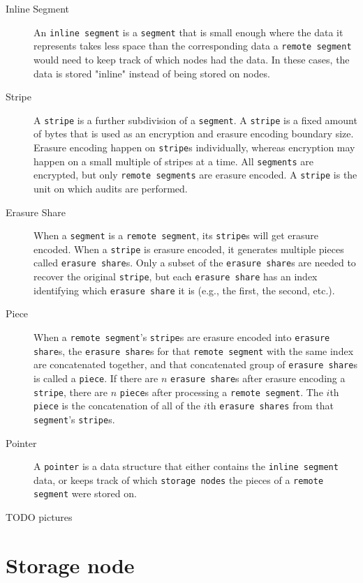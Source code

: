 \documentclass[11pt,fleqn,openany]{book}
\newcommand{\x}[1]{{\tt #1}} \newcommand{\code}[1]{{\em #1}}
\newcommand{\todo}[1]{{\color{red} TODO #1 }}
\begin{document}
\begin{description}
\item[Inline Segment] An \x{inline segment} is a \x{segment} that is small
enough where the data it represents takes less space than the corresponding
data a \x{remote segment} would need to keep track of which nodes had the data.
In these cases, the data is stored "inline" instead of being stored on nodes.

\item[Stripe] A \x{stripe} is a further subdivision of a \x{segment}. A
\x{stripe} is a fixed amount of bytes that is used as an encryption and erasure
encoding boundary size. Erasure encoding happen on \x{stripe}s individually,
whereas encryption may happen on a small multiple of stripes at a time. All
\x{segments} are encrypted, but only \x{remote segments} are erasure encoded.
A \x{stripe} is the unit on which audits are performed.

\item[Erasure Share] When a \x{segment} is a \x{remote segment}, its \x{stripe}s
will get erasure encoded. When a \x{stripe} is erasure encoded, it generates
multiple pieces called \x{erasure share}s. Only a subset of the \x{erasure
share}s are needed to recover the original \x{stripe}, but each \x{erasure
share} has an index identifying which \x{erasure share} it is (e.g., the first,
the second, etc.).

\item[Piece] When a \x{remote segment}'s \x{stripe}s are erasure encoded into
\x{erasure share}s, the \x{erasure share}s for that \x{remote segment} with the
same index are concatenated together, and that concatenated group of \x{erasure
share}s is called a \x{piece}. If there are $n$ \x{erasure share}s after erasure
encoding a \x{stripe}, there are $n$ \x{piece}s after processing a \x{remote
segment}. The $i$th \x{piece} is the concatenation of all of the $i$th
\x{erasure shares} from that \x{segment}'s \x{stripe}s.

\item[Pointer] A \x{pointer} is a data structure that either contains the
\x{inline segment} data, or keeps track of which
\x{storage nodes} the pieces of a \x{remote segment} were stored on.
\end{description}

\todo{pictures}

\section{Storage node}
\end{document}
